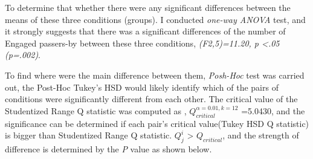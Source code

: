 \begin{table}[H]
\caption{Number of engaged passers-by in three weeks}
\label{tab:engagedofthreeweeks}
\centering
{}
\end{table}

To determine that whether there were any significant differences between the means of these three conditions (groups). I conducted \emph{one-way ANOVA} test, and it strongly suggests that there was a significant differences of the number of Engaged passers-by between these three conditions,
 \emph{(F2,5)=11.20, p <.05 (p=.002)}.

To find where were the main difference between them, \emph{Posh-Hoc} test was carried out, the Post-Hoc Tukey’s HSD would likely identify which of the pairs of conditions were significantly different from each other. The critical value of the Studentized Range Q statistic was computed as , ${Q}_{critical}^{\alpha=0.01,k=12}$ =5.0430, and the significance can be determined if each pair’s critical value(Tukey HSD Q statistic) is bigger than Studentized Range Q statistic. ${Q}_{j}^{i }$ > ${Q}_{critical}$, and the strength of difference is determined by the \emph{P} value as shown below.



\begin{table}[H]
\caption{Post-Hoc Tukey’s HSD}
\label{tab:engage-non-posthoctukey}
\centering
{}
\end{table}

